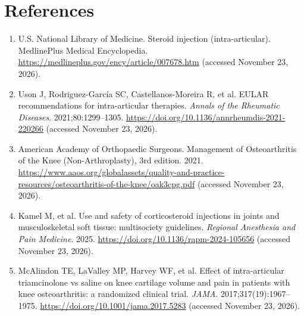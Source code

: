 \section*{References}
\begin{enumerate}
  \item U.S. National Library of Medicine. Steroid injection (intra-articular). MedlinePlus Medical Encyclopedia. \url{https://medlineplus.gov/ency/article/007678.htm} (accessed November 23, 2026).
  \item Uson J, Rodriguez-García SC, Castellanos-Moreira R, et al. EULAR recommendations for intra-articular therapies. \textit{Annals of the Rheumatic Diseases}. 2021;80:1299--1305. \url{https://doi.org/10.1136/annrheumdis-2021-220266} (accessed November 23, 2026).
  \item American Academy of Orthopaedic Surgeons. Management of Osteoarthritis of the Knee (Non-Arthroplasty), 3rd edition. 2021. \url{https://www.aaos.org/globalassets/quality-and-practice-resources/osteoarthritis-of-the-knee/oak3cpg.pdf} (accessed November 23, 2026).
  \item Kamel M, et al. Use and safety of corticosteroid injections in joints and musculoskeletal soft tissue: multisociety guidelines. \textit{Regional Anesthesia and Pain Medicine}. 2025. \url{https://doi.org/10.1136/rapm-2024-105656} (accessed November 23, 2026).
  \item McAlindon TE, LaValley MP, Harvey WF, et al. Effect of intra-articular triamcinolone vs saline on knee cartilage volume and pain in patients with knee osteoarthritis: a randomized clinical trial. \textit{JAMA}. 2017;317(19):1967--1975. \url{https://doi.org/10.1001/jama.2017.5283} (accessed November 23, 2026).
\end{enumerate}

\clearpage
